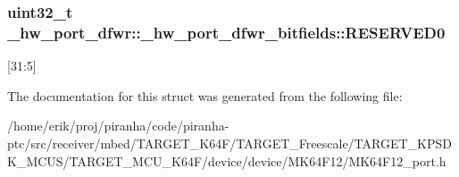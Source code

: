 \subsubsection[{\texorpdfstring{R\+E\+S\+E\+R\+V\+E\+D0}{RESERVED0}}]{\setlength{\rightskip}{0pt plus 5cm}uint32\+\_\+t \+\_\+hw\+\_\+port\+\_\+dfwr\+::\+\_\+hw\+\_\+port\+\_\+dfwr\+\_\+bitfields\+::\+R\+E\+S\+E\+R\+V\+E\+D0}\hypertarget{struct__hw__port__dfwr_1_1__hw__port__dfwr__bitfields_a50cc6568fabd9801f2bd3a756e04dd8f}{}\label{struct__hw__port__dfwr_1_1__hw__port__dfwr__bitfields_a50cc6568fabd9801f2bd3a756e04dd8f}
\mbox{[}31\+:5\mbox{]} 

The documentation for this struct was generated from the following file\+:\begin{DoxyCompactItemize}
\item 
/home/erik/proj/piranha/code/piranha-\/ptc/src/receiver/mbed/\+T\+A\+R\+G\+E\+T\+\_\+\+K64\+F/\+T\+A\+R\+G\+E\+T\+\_\+\+Freescale/\+T\+A\+R\+G\+E\+T\+\_\+\+K\+P\+S\+D\+K\+\_\+\+M\+C\+U\+S/\+T\+A\+R\+G\+E\+T\+\_\+\+M\+C\+U\+\_\+\+K64\+F/device/device/\+M\+K64\+F12/M\+K64\+F12\+\_\+port.\+h\end{DoxyCompactItemize}

